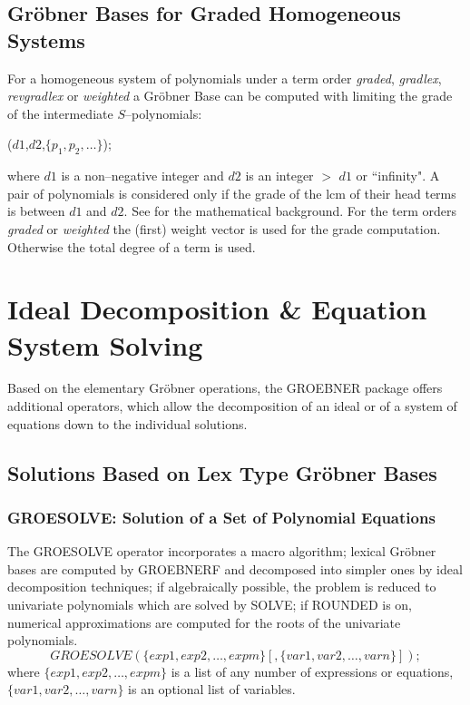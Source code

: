 \subsection{Gr\"obner Bases for Graded Homogeneous Systems}

For a homogeneous system of polynomials under a term order
{\it graded}, {\it gradlex}, {\it revgradlex} or {\it weighted}
a Gr\"obner Base can be computed with limiting the grade
of the intermediate $S$--polynomials:
\begin{description}
\item [{\it dd\_groebner}]($d1$,$d2$,$\{p_1,p_2,\ldots\}$);
\end{description}
where $d1$ is a non--negative integer and $d2$ is an integer
$>$ $d1$ or ``infinity". A pair of polynomials is considered
only if the grade of the lcm of their head terms is between
$d1$ and $d2$. See \cite{BeWei:93} for the mathematical background.
For the term orders {\it graded} or {\it weighted} the (first) weight
vector is used for the grade computation. Otherwise the total
degree of a term is used.

\section{Ideal Decomposition \& Equation System Solving}
Based on the elementary Gr\"obner operations, the GROEBNER package offers
additional operators, which allow the decomposition of an ideal or of a
system of equations down to the individual solutions.
\subsection{Solutions Based on Lex Type Gr\"obner Bases}
\subsubsection{GROESOLVE: Solution of a Set of Polynomial Equations}
 
The GROESOLVE operator incorporates a macro algorithm;
lexical Gr\"obner bases are computed by GROEBNERF and decomposed
into simpler ones by ideal decomposition techniques; if algebraically
possible, the problem is reduced to univariate polynomials which are
solved by SOLVE; if ROUNDED is on, numerical approximations are
computed for the roots of the univariate polynomials.
\[
 GROESOLVE(\{exp1, exp2, \ldots , expm\}[,\{var1, var2, \ldots ,
varn\}]); \]
where $\{exp1, exp2,\ldots , expm\}$ is a list of any number of
expressions or equations, $\{var1, var2, \ldots , varn\}$ is an
optional list of variables.

